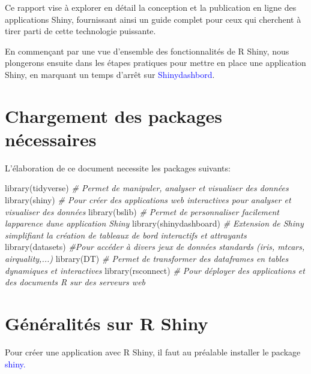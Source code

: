 \documentclass[
]{article}
\newenvironment{Shaded}{\begin{snugshade}}{\end{snugshade}}
\newcommand{\CommentTok}[1]{\textcolor[rgb]{0.56,0.35,0.01}{\textit{#1}}}
\newcommand{\FunctionTok}[1]{\textcolor[rgb]{0.00,0.00,0.00}{#1}}
\newcommand{\NormalTok}[1]{#1}
\begin{document}
Ce rapport vise à explorer en détail la conception et la publication en
ligne des applications Shiny, fournissant ainsi un guide complet pour
ceux qui cherchent à tirer parti de cette technologie puissante.

En commençant par une vue d'ensemble des fonctionnalités de R Shiny,
nous plongerons ensuite dans les étapes pratiques pour mettre en place
une application Shiny, en marquant un temps d'arrêt sur
\textcolor{blue}{Shinydashbord}.

\newpage

\hypertarget{chargement-des-packages-nuxe9cessaires}{%
\section{Chargement des packages
nécessaires}\label{chargement-des-packages-nuxe9cessaires}}

L'élaboration de ce document necessite les packages suivants:

\begin{Shaded}
\begin{Highlighting}[]
\FunctionTok{library}\NormalTok{(tidyverse)  }
\CommentTok{\# Permet de manipuler, analyser et visualiser des données }
\FunctionTok{library}\NormalTok{(shiny) }
\CommentTok{\# Pour créer des applications web interactives pour analyser et visualiser des données }
\FunctionTok{library}\NormalTok{(bslib) }
\CommentTok{\# Permet de personnaliser facilement l\textquotesingle{}apparence d\textquotesingle{}une application Shiny}
\FunctionTok{library}\NormalTok{(shinydashboard)}
\CommentTok{\# Extension de Shiny simplifiant la création de tableaux de bord interactifs et attrayants }
\FunctionTok{library}\NormalTok{(datasets)}
\CommentTok{\#Pour accéder à divers jeux de données standards (iris, mtcars, airquality,...)}
\FunctionTok{library}\NormalTok{(DT) }
\CommentTok{\# Permet de transformer des dataframes en tables dynamiques et interactives}
\FunctionTok{library}\NormalTok{(rsconnect) }
\CommentTok{\# Pour déployer des applications et des documents R sur des serveurs web}
\end{Highlighting}
\end{Shaded}

\hypertarget{guxe9nuxe9ralituxe9s-sur-r-shiny}{%
\section{Généralités sur R
Shiny}\label{guxe9nuxe9ralituxe9s-sur-r-shiny}}

Pour créer une application avec R Shiny, il faut au préalable installer
le package \textcolor{blue}{shiny.}
\end{document}

